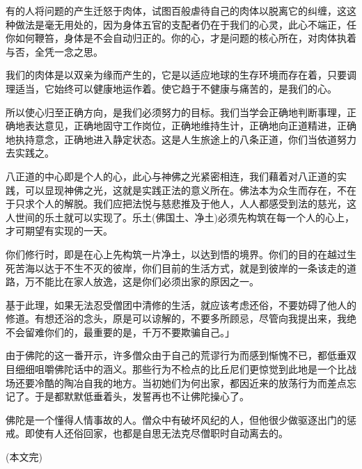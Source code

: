 \documentclass[twoside,openany]{book}
\begin{document}
有的人将问题的产生迁怒于肉体，试图百般虐待自己的肉体以脱离它的纠缠，这这种做法是毫无用处的，因为身体五官的支配者仍在于我们的心灵，此心不端正，任你如何鞭笞，身体是不会自动归正的。你的心，才是问题的核心所在，对肉体执着与否，全凭一念之思。

我们的肉体是以双亲为缘而产生的，它是以适应地球的生存环境而存在着，只要调理适当，它始终可以健康地运作着。使它趋于不健康与痛苦的，是我们的心。

所以使心归至正确方向，是我们必须努力的目标。我们当学会正确地判断事理，正确地表达意见，正确地固守工作岗位，正确地维持生计，正确地向正道精进，正确地执持意念，正确地进入静定状态。这是人生旅途上的八条正道，你们当依道努力去实践之。

八正道的中心即是个人的心，此心与神佛之光紧密相连，我们藉着对八正道的实践，可以显现神佛之光，这就是实践正法的意义所在。佛法本为众生而存在，不在于只求个人的解脱。我们应把法悦与慈悲推及于他人，人人都感受到法的慈光，这人世间的乐土就可以实现了。乐土(佛国土、净土)必须先构筑在每一个人的心上，才可期望有实现的一天。

你们修行时，即是在心上先构筑一片净土，以达到悟的境界。你们的目的在越过生死苦海以达于不生不灭的彼岸，你们目前的生活方式，就是到彼岸的一条该走的道路，万不能比在家人放逸，这是你们必须出家的原因之一。

基于此理，如果无法忍受僧团中清修的生活，就应该考虑还俗，不要妨碍了他人的修道。有想还浴的念头，原是可以谅解的，不要多所顾忌，尽管向我提出来，我绝不会留难你们的，最重要的是，千万不要欺骗自己。」

由于佛陀的这一番开示，许多僧众由于自己的荒谬行为而感到惭愧不已，都低垂双目细细咀嚼佛陀话中的涵义。那些行为不检点的比丘尼们更惊觉到此地是一个比战场还要冷酷的陶冶自我的地方。当初她们为何出家，都因近来的放荡行为而差点忘记了。于是都默默低垂着头，发誓再也不让佛陀操心了。

佛陀是一个懂得人情事故的人。僧众中有破坏风纪的人，但他很少做驱逐出门的惩戒。即使有人还俗回家，也都是自思无法克尽僧职时自动离去的。

(本文完)
\end{document}
